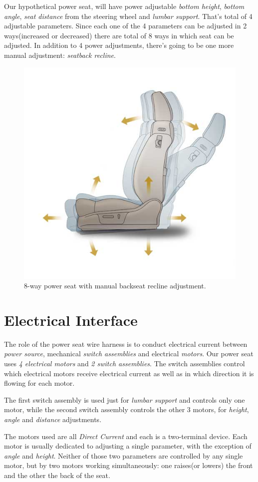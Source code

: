 \documentclass[12pt,letterpaper]{article}
\begin{document}
Our hypothetical power seat, will have power adjustable \textit{bottom height}, \textit{bottom angle}, \textit{seat distance} from the steering wheel and \textit{lumbar support}. That’s total of 4 adjustable parameters. Since each one of the 4 parameters can be adjusted in 2 ways(increased or decreased) there are total of 8 ways in which seat can be adjusted. In addition to 4 power adjustments, there’s going to be one more manual adjustment: \textit{seatback recline}.
\begin{figure}[b!]
  \centering
  \includegraphics[width=0.70\linewidth]{8-way-seat.jpg}
  \caption{8-way power seat with manual backseat recline adjustment.}
  \label{fig:wireharness1}
\end{figure}
\newpage
{}
\section{Electrical Interface}
The role of the power seat wire harness is to conduct electrical current between \textit{power source}, mechanical \textit{switch assemblies} and electrical \textit{motors}. Our power seat uses \textit{4 electrical motors} and \textit{2 switch assemblies}. The switch assemblies control which electrical motors receive electrical current as well as in which direction it is flowing for each motor.

The first switch assembly is used just for \textit{lumbar support} and controls only one motor, while the second switch assembly controls the other 3 motors, for \textit{height}, \textit{angle} and \textit{distance} adjustments.

The motors used are all \textit{Direct Current} and each is a two-terminal device. Each motor is usually dedicated to adjusting a single parameter, with the exception of \textit{angle} and \textit{height}. Neither of those two parameters are controlled by any single motor, but by two motors working simultaneously: one raises(or lowers) the front and the other the back of the seat.
\end{document}
